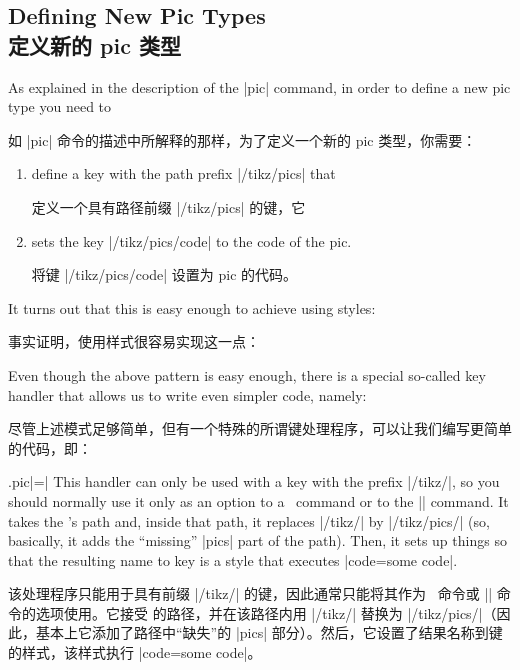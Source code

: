 \subsection{Defining New Pic Types\\定义新的 pic 类型}
\label{section-new-pic-types}

As explained in the description of the |pic| command, in order to define a new
pic type you need to

如 |pic| 命令的描述中所解释的那样，为了定义一个新的 pic 类型，你需要：

\begin{enumerate}
    \item define a key with the path prefix |/tikz/pics| that

    定义一个具有路径前缀 |/tikz/pics| 的键，它
    \item sets the key |/tikz/pics/code| to the code of the pic.

    将键 |/tikz/pics/code| 设置为 pic 的代码。
\end{enumerate}

It turns out that this is easy enough to achieve using styles:


事实证明，使用样式很容易实现这一点：

\begin{codeexample}
\end{codeexample}

Even though the above pattern is easy enough, there is a special so-called key
handler that allows us to write even simpler code, namely:

尽管上述模式足够简单，但有一个特殊的所谓键处理程序，可以让我们编写更简单的代码，即：
\begin{codeexample}
\end{codeexample}

\begin{handler}{{.pic}|=|}
    This handler can only be used with a key with the prefix |/tikz/|, so you
    should normally use it only as an option to a \tikzname\ command or to the
    |\tikzset| command. It takes the 's path and, inside that path,
    it replaces |/tikz/| by |/tikz/pics/| (so, basically, it adds the
    ``missing'' |pics| part of the path). Then, it sets up things so that the
    resulting name to key is a style that executes |code=some code|.

该处理程序只能用于具有前缀 |/tikz/| 的键，因此通常只能将其作为 \tikzname\ 命令或 |\tikzset| 命令的选项使用。它接受  的路径，并在该路径内用 |/tikz/| 替换为 |/tikz/pics/|（因此，基本上它添加了路径中“缺失”的 |pics| 部分）。然后，它设置了结果名称到键的样式，该样式执行 |code=some code|。
\end{handler}


